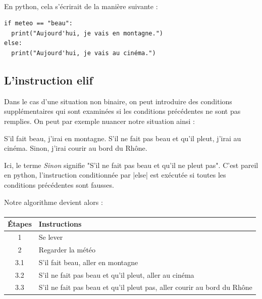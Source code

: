 \documentclass[11pt, a4paper]{book}
\begin{document}
\paragraph{}
En python, cela s'écrirait de la manière suivante :

\begin{lstlisting}
if meteo == "beau":
  print("Aujourd'hui, je vais en montagne.")
else:
  print("Aujourd'hui, je vais au cinéma.")
\end{lstlisting}

\subsection{L'instruction \textsf{elif}}
Dans le cas d'une situation non binaire, on peut introduire des conditions supplémentaires qui sont examinées si les conditions précédentes ne sont pas remplies. On peut par exemple nuancer notre situation ainsi : 

 \begin{example} S'il fait beau, j'irai en montagne. S'il ne fait pas beau et qu'il pleut, j'irai au cinéma. Sinon, j'irai courir au bord du Rhône. \end{example}
 
 \begin{remarque} Ici, le terme \textit{Sinon} signifie "S'il ne fait pas beau et qu'il ne pleut pas". C'est pareil en python, l'instruction conditionnée par |else| est exécutée si toutes les conditions précédentes sont fausses. \end{remarque}
 
 Notre algorithme devient alors : 
 
\paragraph{}
\begin{tabular}{ c  l  }
     Étapes & Instructions \\ \hline
     1 & Se lever  \\ 
     2 & Regarder la météo  \\
     3.1 & S'il fait beau, aller en montagne  \\
     3.2 & S'il ne fait pas beau et qu'il pleut, aller au cinéma  \\
     3.3 & S'il ne fait pas beau et qu'il pleut pas, aller courir au bord du Rhône \\
\end{tabular}
\end{document}
